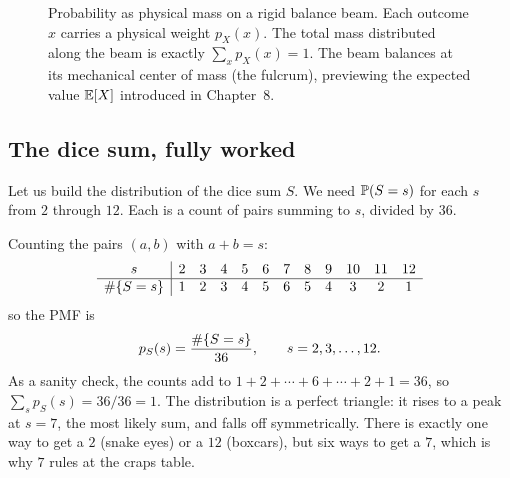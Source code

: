 \begin{figure}[H]
\caption{Probability as physical mass on a rigid balance beam. Each outcome $x$ carries a physical weight $p_X(x)$. The total mass distributed along the beam is exactly $\sum_x p_X(x) = 1$. The beam balances at its mechanical center of mass (the fulcrum), previewing the expected value $\E[X]$ introduced in Chapter~8.}
\label{ch06:fig-balance-beam}
\end{figure}

\subsection{The dice sum, fully worked}

Let us build the distribution of the dice sum $S$. We need
$\P(S = s)$ for each $s$ from $2$ through $12$. Each is a count of pairs summing to $s$,
divided by $36$.

\begin{example}
\label{ch06:ex-dice-sum}
Counting the pairs $(a,b)$ with $a+b = s$:
\[
\begin{array}{c|ccccccccccc}
s & 2 & 3 & 4 & 5 & 6 & 7 & 8 & 9 & 10 & 11 & 12 \\ \hline
\#\set{S=s} & 1 & 2 & 3 & 4 & 5 & 6 & 5 & 4 & 3 & 2 & 1
\end{array}
\]
so the PMF is
\[
  p_S(s) = \frac{\#\set{S=s}}{36},
  \qquad s = 2,3,\dots,12.
\]
As a sanity check, the counts add to $1+2+\cdots+6+\cdots+2+1 = 36$, so
$\sum_s p_S(s) = 36/36 = 1$. The distribution is a perfect triangle: it rises to a
peak at $s = 7$, the most likely sum, and falls off symmetrically. There is exactly
one way to get a $2$ (snake eyes) or a $12$ (boxcars), but six ways to get a $7$,
which is why $7$ rules at the craps table.
\end{example}

